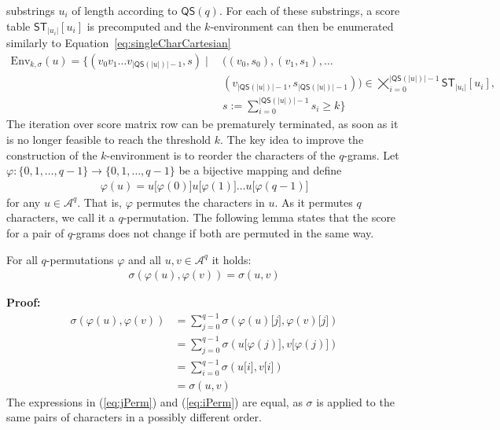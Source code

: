 \documentclass[twoside,a4paper,bsc]{master}
\newcommand{\Subchar}[2]{#1\lbrack #2\rbrack}
\newcommand{\Scoretablename}[0]{\mathsf{ST}}
\newcommand{\Scoretable}[2]{\Scoretablename_{#1}[#2]}
\newcommand{\Alpha}[0]{\mathcal{A}}
\newcommand{\Qsplit}{\mathsf{QS}}
\newcommand{\Skiptheorem}{\smallskipamount}
\newcommand{\StartFormal}[1]{\par\addvspace{\Skiptheorem}\noindent\textbf{#1}}
\newcommand{\EndFormal}{\par\addvspace{\Skiptheorem}}
\newenvironment{Proof}{\StartFormal{Proof:}}{\EndFormal}
\begin{document}
substrings \(u_{i}\) of length according to \(\Qsplit(q)\).
For each of these substrings, a score table \(\Scoretable{|u_{i}|}{u_i}\)
is
precomputed and the \(k\)-environment can then be enumerated similarly to
Equation~\ref{eq:singleCharCartesian}
\begin{align}
\text{Env}_{k,\sigma}(u) = \{(v_{0}v_{1}\ldots v_{|\Qsplit(|u|)|-1},s) \mid
& ~((v_{0},s_{0}),(v_{1},s_{1}),\ldots \nonumber\\
& ~(v_{|\Qsplit(|u|)|-1},s_{|\Qsplit(|u|)|-1}))\in
\bigtimes\nolimits_{i=0}^{|\Qsplit(|u|)|-1}\Scoretable{|u_i|}{u_i},\nonumber\\
& ~s:=\sum\nolimits_{i=0}^{|\Qsplit(|u|)|-1}s_{i}\geq
k\}\label{ScoreTablesCartesian}
\end{align}
The iteration over score matrix row can be prematurely terminated, as soon
as it is no longer feasible to reach the threshold \(k\).
The key idea to improve the construction of the \(k\)-environment
is to reorder the characters of the \(q\)-grams. Let
\(\varphi:\{0,1,\ldots,q-1\}\to\{0,1,\ldots,q-1\}\) be a bijective mapping
and define
\begin{align}
\varphi(u)=\Subchar{u}{\varphi(0)}\Subchar{u}{\varphi(1)}\ldots\Subchar{u}{\varphi(q-1)}
\end{align}
for any \(u\in\Alpha^{q}\). That is, \(\varphi\) permutes the
characters in \(u\). As it permutes \(q\) characters, we call it a
\(q\)-permutation. The following lemma
states that the score for a pair of \(q\)-grams does not change if both are
permuted in the same way.
\begin{Lemma}
\label{permutationProof}
For all \(q\)-permutations \(\varphi\) and all \(u,v\in\Alpha^{q}\) it
holds:
\begin{align}
\sigma(\varphi(u),\varphi(v))=\sigma(u,v)
\end{align}
\begin{Proof}
\begin{align}
\sigma(\varphi(u),\varphi(v))
&= \sum_{j=0}^{q-1} \sigma (\Subchar{\varphi(u)}{j},
\Subchar{\varphi(v)}{j})\\
&= \sum_{j=0}^{q-1} \sigma
(\Subchar{u}{\varphi(j)},\Subchar{v}{\varphi(j)})\label{eq:jPerm}\\
&= \sum_{i=0}^{q-1} \sigma
(\Subchar{u}{i},\Subchar{v}{i})\label{eq:iPerm}\\
&= \sigma(u,v)
\end{align}
The expressions in (\ref{eq:jPerm}) and (\ref{eq:iPerm}) are equal,
as \(\sigma\) is applied to the same pairs of characters in
a possibly different order.
\end{Proof}
\end{Lemma}
\end{document}
